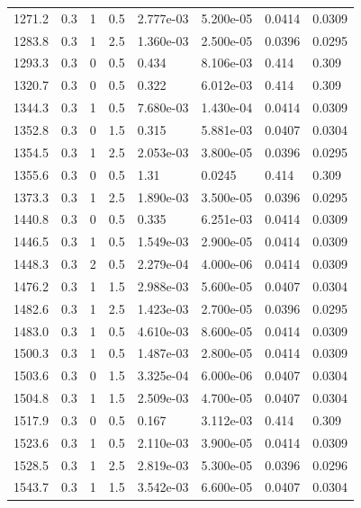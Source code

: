 \documentclass[preview]{standalone}
\begin{document}
{{{\begin{tabular}{L{1.2cm}C{1.2cm} C{0.3cm}C{0.5cm} C{1.4cm}C{1.4cm} C{1.4cm}C{1.4cm}}
  1271.2  &   0.3  & 1     & 0.5 &  2.777e-03  & 5.200e-05  & 0.0414 &  0.0309   \\ 
  1283.8  &   0.3  & 1     & 2.5 &  1.360e-03  & 2.500e-05  & 0.0396 &  0.0295   \\ 
  1293.3  &   0.3  & 0     & 0.5 &  0.434  & 8.106e-03  & 0.414 &  0.309   \\ 
  1320.7  &   0.3  & 0     & 0.5 &  0.322  & 6.012e-03  & 0.414 &  0.309   \\ 
  1344.3  &   0.3  & 1     & 0.5 &  7.680e-03  & 1.430e-04  & 0.0414 &  0.0309   \\ 
  1352.8  &   0.3  & 0     & 1.5 &  0.315  & 5.881e-03  & 0.0407 &  0.0304   \\ 
  1354.5  &   0.3  & 1     & 2.5 &  2.053e-03  & 3.800e-05  & 0.0396 &  0.0295   \\ 
  1355.6  &   0.3  & 0     & 0.5 &  1.31  & 0.0245  & 0.414 &  0.309   \\ 
  1373.3  &   0.3  & 1     & 2.5 &  1.890e-03  & 3.500e-05  & 0.0396 &  0.0295   \\ 
  1440.8  &   0.3  & 0     & 0.5 &  0.335  & 6.251e-03  & 0.0414 &  0.0309   \\ 
  1446.5  &   0.3  & 1     & 0.5 &  1.549e-03  & 2.900e-05  & 0.0414 &  0.0309   \\ 
  1448.3  &   0.3  & 2     & 0.5 &  2.279e-04  & 4.000e-06  & 0.0414 &  0.0309   \\ 
  1476.2  &   0.3  & 1     & 1.5 &  2.988e-03  & 5.600e-05  & 0.0407 &  0.0304   \\ 
  1482.6  &   0.3  & 1     & 2.5 &  1.423e-03  & 2.700e-05  & 0.0396 &  0.0295   \\ 
  1483.0  &   0.3  & 1     & 0.5 &  4.610e-03  & 8.600e-05  & 0.0414 &  0.0309   \\ 
  1500.3  &   0.3  & 1     & 0.5 &  1.487e-03  & 2.800e-05  & 0.0414 &  0.0309   \\ 
  1503.6  &   0.3  & 0     & 1.5 &  3.325e-04  & 6.000e-06  & 0.0407 &  0.0304   \\ 
  1504.8  &   0.3  & 1     & 1.5 &  2.509e-03  & 4.700e-05  & 0.0407 &  0.0304   \\ 
  1517.9  &   0.3  & 0     & 0.5 &  0.167  & 3.112e-03  & 0.414 &  0.309   \\ 
  1523.6  &   0.3  & 1     & 0.5 &  2.110e-03  & 3.900e-05  & 0.0414 &  0.0309   \\ 
  1528.5  &   0.3  & 1     & 2.5 &  2.819e-03  & 5.300e-05  & 0.0396 &  0.0296   \\ 
  1543.7  &   0.3  & 1     & 1.5 &  3.542e-03  & 6.600e-05  & 0.0407 &  0.0304   \\ 

\end{tabular}}}}
\end{document}
